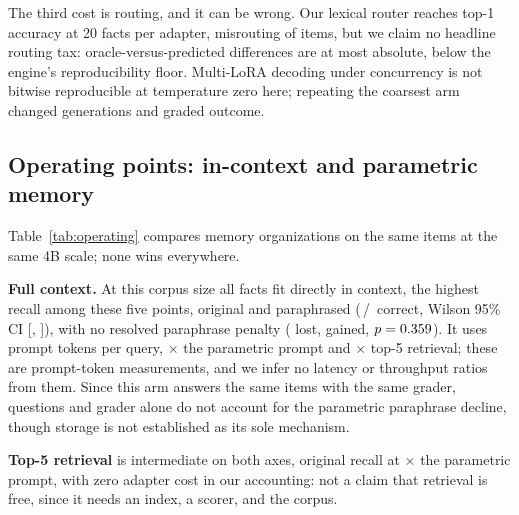 \documentclass{article}
\begin{document}
The third cost is routing, and it can be wrong. Our lexical router reaches
\RouterTopOne{} top-1 accuracy at 20 facts per adapter, misrouting
\RouterMisGTwenty{} of \NPerArm{} items, but we claim no headline routing tax:
oracle-versus-predicted differences are at most \MaxRoutingDelta{} absolute, below
the engine's reproducibility floor. Multi-LoRA decoding under concurrency is not
bitwise reproducible at temperature zero here; repeating the coarsest arm changed
\NondetGens{} generations and \NondetChanged{} graded outcome.

\subsection{Operating points: in-context and parametric memory}
\label{sec:operating}

Table~\ref{tab:operating} compares memory organizations on the same items at the
same 4B scale; none wins everywhere.

\begin{table}[t]
  \centering
  \caption{Operating points for the same \NPerArm{}-fact memory. Prompt tokens
  recur per query, as a ratio to the \ParamTokens{}-token parametric prompt;
  bank MB and bank build seconds are one-time totals across the ten-adapter g20
  bank (the text gives per-adapter build seconds), and zero means no
  adapter-construction cost, not zero indexing or serving infrastructure.}
  \label{tab:operating}
  \small
  
\end{table}

\textbf{Full context.} At this corpus size all \NPerArm{} facts fit directly in
context, the highest recall among these five points, \FullCtxQ{}
original and \FullCtxPQ{} paraphrased (\FullCtxNHit{}\,/\,\FullCtxNGrad{} correct,
Wilson 95\% CI [\FullCtxQCILo{}, \FullCtxQCIHi{}]), with no resolved paraphrase
penalty (\FullCtxLost{} lost, \FullCtxGained{} gained, $p=0.359{}$). It
uses \FullCtxTokens{} prompt tokens per query, \FullCtxRatio{}$\times$ the
parametric prompt and \FullCtxRatioRetr{}$\times$ top-5 retrieval; these are
prompt-token measurements, and we infer no latency or throughput ratios from them.
Since this arm answers the same items with the same grader, questions and grader
alone do not account for the parametric paraphrase decline, though storage is not
established as its sole mechanism.

\textbf{Top-5 retrieval} is intermediate on both axes, \RetrQ{} original recall at
\PromptTokenRatio{}$\times$ the parametric prompt, with zero adapter cost in our
accounting: not a claim that retrieval is free, since it needs an index, a scorer,
and the corpus.
\end{document}
